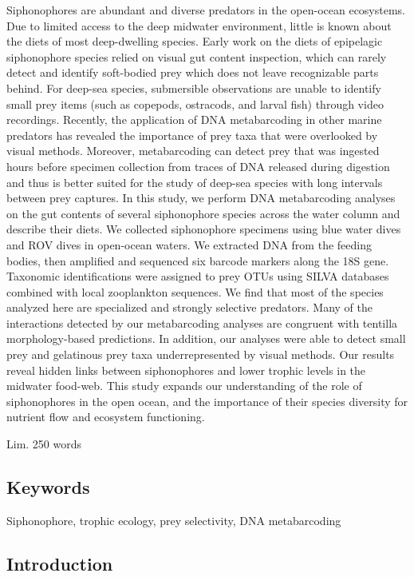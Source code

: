 \documentclass[12pt,]{article}
\begin{document}
Siphonophores are abundant and diverse predators in the open-ocean ecosystems. Due to limited access to the deep midwater environment, little is known about the diets of most deep-dwelling species. Early work on the diets of epipelagic siphonophore species relied on visual gut content inspection, which can rarely detect and identify soft-bodied prey which does not leave recognizable parts behind. For deep-sea species, submersible observations are unable to identify small prey items (such as copepods, ostracods, and larval fish) through video recordings. Recently, the application of DNA metabarcoding in other marine predators has revealed the importance of prey taxa that were overlooked by visual methods. Moreover, metabarcoding can detect prey that was ingested hours before specimen collection from traces of DNA released during digestion and thus is better suited for the study of deep-sea species with long intervals between prey captures. In this study, we perform DNA metabarcoding analyses on the gut contents of several siphonophore species across the water column and describe their diets. We collected siphonophore specimens using blue water dives and ROV dives in open-ocean waters. We extracted DNA from the feeding bodies, then amplified and sequenced six barcode markers along the 18S gene. Taxonomic identifications were assigned to prey OTUs using SILVA databases combined with local zooplankton sequences. We find that most of the species analyzed here are specialized and strongly selective predators. Many of the interactions detected by our metabarcoding analyses are congruent with tentilla morphology-based predictions. In addition, our analyses were able to detect small prey and gelatinous prey taxa underrepresented by visual methods. Our results reveal hidden links between siphonophores and lower trophic levels in the midwater food-web. This study expands our understanding of the role of siphonophores in the open ocean, and the importance of their species diversity for nutrient flow and ecosystem functioning.

Lim. 250 words

\hypertarget{keywords}{%
\subsection*{Keywords}\label{keywords}}

Siphonophore, trophic ecology, prey selectivity, DNA metabarcoding

\hypertarget{introduction}{%
\subsection*{Introduction}\label{introduction}}
\end{document}
